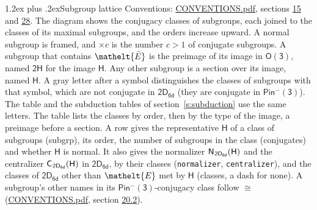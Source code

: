 \documentclass[10pt,a4paper]{article}
\makeatletter
\renewcommand\section{\@startsection{section}{1}{\z@}{-3ex plus -1ex minus -.2ex}%
  {1.2ex plus .2ex}{\normalfont\large\sffamily\bfseries\color{parttitle}}}
\numberwithin{equation}{section}
\newcommand{\eltfont}[1]{{\let\sigma\eltsigma\mathelt{#1}}}
\newcommand{\grp}[1]{\mathsf{#1}}
\newcommand{\cls}[1]{\eltfont{#1}}
\newcommand{\elt}[1]{\eltfont{#1}}
\newcommand{\samecls}{\cong}
\newcommand{\barred}[1]{\bar{#1}}
\newcommand{\hairsp}{\mkern1mu}
\makeatother
\begin{document}
\section{Subgroup lattice}\label{s:subgroups}
Conventions: \href{../../CONVENTIONS.pdf}{CONVENTIONS.pdf}, sections \href{../../../rotation/CONVENTIONS.pdf\#conv.15}{15} and \href{../../CONVENTIONS.pdf\#conv.28}{28}.
The diagram shows the conjugacy classes of subgroups, each joined to the classes of its maximal subgroups, and the orders increase upward. A normal subgroup is framed, and ${\times}c$ is the number $c > 1$ of conjugate subgroups. \label{n:group.H}A subgroup that contains $\elt{\barred{E}}$ is the preimage of its image in $\grp{O(3)}$, named $\grp{2H}$ for the image $\grp{H}$. Any other subgroup is a section over its image, named $\grp{H}$. \label{n:mark.letter}A gray letter after a symbol distinguishes the classes of subgroups with that symbol, which are not conjugate in $\grp{2D_{6d}}$ (they are conjugate in \href{Pinminus3.pdf}{$\grp{Pin^{-}(3)}$}). The table and the subduction tables of section~\ref{s:subduction} use the same letters. The table lists the classes by order, then by the type of the image, a preimage before a section. \label{n:head.subgroup}\label{n:head.order}\label{n:head.conjugates}\label{n:head.normal}A row gives the representative $\grp{H}$ of a class of subgroups (subgrp), its order, the number of subgroups in the class (conjugates) and whether $\grp{H}$ is normal. \label{n:group.normalizer}\label{n:group.centralizer}\label{n:head.classes}It also gives the normalizer $\grp{N}_{\hairsp \grp{2D_{6d}}}(\grp{H})$ and the centralizer $\grp{C}_{\hairsp \grp{2D_{6d}}}(\grp{H})$ in $\grp{2D_{6d}}$, by their classes (\texttt{normalizer}, \texttt{centralizer}), and the classes of $\grp{2D_{6d}}$ other than $\cls{E}$ met by $\grp{H}$ (classes, a dash for none). A subgroup's other names in its \href{Pinminus3.pdf}{$\grp{Pin^{-}(3)}$}-conjugacy class follow $\samecls$ (\href{../../CONVENTIONS.pdf}{CONVENTIONS.pdf}, section \href{../../CONVENTIONS.pdf\#conv.20.2}{20.2}).
\end{document}

